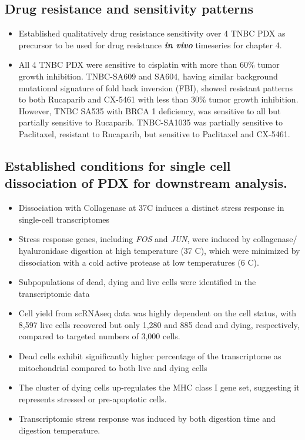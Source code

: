  \subsection{Drug resistance and sensitivity patterns}
\begin{itemize} 
 \item Established qualitatively drug resistance sensitivity over 4 TNBC PDX as precursor to be used for drug resistance \textbf{\textit{in vivo}} timeseries for chapter 4.
 \item All 4 TNBC PDX were sensitive to cisplatin with more than 60\% tumor growth inhibition. TNBC-SA609 and SA604, having similar background mutational signature of fold back inversion (FBI), showed resistant patterns to both Rucaparib and CX-5461 with less than 30\% tumor growth inhibition. However, TNBC SA535 with BRCA 1 deficiency, was sensitive to all but partially sensitive to Rucaparib. TNBC-SA1035 was partially sensitive to Paclitaxel, resistant to Rucaparib, but sensitive to Paclitaxel and CX-5461.

\end{itemize}

 \subsection{Established conditions for single cell dissociation of PDX for downstream analysis.}
\begin{itemize} 
 
 \item Dissociation with Collagenase at 37\textdegree C induces a distinct stress response in single-cell transcriptomes
  \item Stress response genes, including \textit{FOS} and \textit{JUN}, were induced by collagenase/ hyaluronidase digestion at high temperature (37 \textdegree C), which were minimized by dissociation with a cold active protease at low temperatures (6 \textdegree C).
 \item  Subpopulations of dead, dying and live cells were identified in the transcriptomic data
  \item Cell yield from scRNAseq data was highly dependent on the cell status, with 8,597 live cells recovered but only 1,280 and 885 dead and dying, respectively, compared to targeted numbers of 3,000 cells.
   \item Dead cells exhibit significantly higher percentage of the transcriptome as mitochondrial compared to both live and dying cells
    \item The cluster of dying cells up-regulates the MHC class I gene set, suggesting it represents stressed or pre-apoptotic cells.
    \item Transcriptomic stress response was induced by both digestion time and digestion temperature.


\end{itemize}

